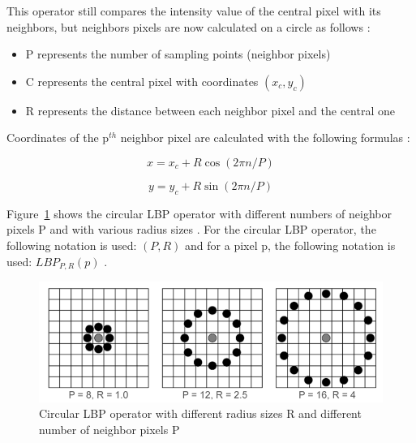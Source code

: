\noindent This operator still compares the intensity value of the central pixel with its neighbors, but neighbors pixels are now calculated on a circle as follows \cite{GAN08}:

\begin{itemize}
  \item P represents the number of sampling points (neighbor pixels)
  \item C represents the central pixel with coordinates $ (x_c,y_c) $
  \item R represents the distance between each neighbor pixel and the central one
\end{itemize}

\noindent Coordinates of the p$^{th}$ neighbor pixel are calculated with the following formulas \cite{JUL07}:
\newline

\begin{equation}
   x = x_c + R\cos(2\pi n/P)
\end{equation}

\begin{equation}
   y = y_c + R\sin(2\pi n/P)
\end{equation}

\vspace{\baselineskip}
\noindent Figure~\ref{lbp_circular_operator} shows the circular LBP operator with different numbers of neighbor pixels P and with various radius sizes \cite{JUL07}. For the circular LBP operator, the following notation is used: $ (P,R) $ and for a pixel p, the following notation is used: $ LBP_{P,R}(p) $ \cite{GAN08}.
\newline

\begin{figure}[!h]
\begin{center}
\noindent \includegraphics[scale=0.6]{figures/lbp_circular_operator} 
\newline
\caption{Circular LBP operator with different radius sizes R and different number of neighbor pixels P}
\label{lbp_circular_operator}
\end{center} 
\end{figure}

